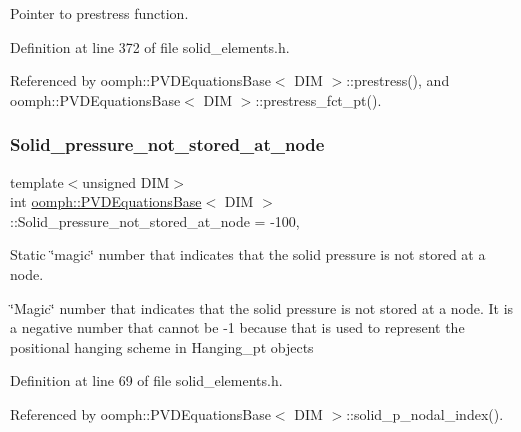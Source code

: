 Pointer to prestress function. 



Definition at line 372 of file solid\+\_\+elements.\+h.



Referenced by oomph\+::\+P\+V\+D\+Equations\+Base$<$ D\+I\+M $>$\+::prestress(), and oomph\+::\+P\+V\+D\+Equations\+Base$<$ D\+I\+M $>$\+::prestress\+\_\+fct\+\_\+pt().

\mbox{\label{classoomph_1_1PVDEquationsBase_a8827854c304496d9d613a99a972dfd51}} 
\subsubsection{\texorpdfstring{Solid\+\_\+pressure\+\_\+not\+\_\+stored\+\_\+at\+\_\+node}{Solid\_pressure\_not\_stored\_at\_node}}
{\footnotesize\ttfamily template$<$unsigned D\+IM$>$ \\
int \hyperlink{classoomph_1_1PVDEquationsBase}{oomph\+::\+P\+V\+D\+Equations\+Base}$<$ D\+IM $>$\+::Solid\+\_\+pressure\+\_\+not\+\_\+stored\+\_\+at\+\_\+node = -\/100\hspace{0.3cm}{\ttfamily [static]}, {\ttfamily [private]}}



Static \char`\"{}magic\char`\"{} number that indicates that the solid pressure is not stored at a node. 

\char`\"{}\+Magic\char`\"{} number that indicates that the solid pressure is not stored at a node. It is a negative number that cannot be -\/1 because that is used to represent the positional hanging scheme in Hanging\+\_\+pt objects 

Definition at line 69 of file solid\+\_\+elements.\+h.



Referenced by oomph\+::\+P\+V\+D\+Equations\+Base$<$ D\+I\+M $>$\+::solid\+\_\+p\+\_\+nodal\+\_\+index().

\mbox{\label{classoomph_1_1PVDEquationsBase_a0d7944084e6386d9a23225420e7dcdff}} 
